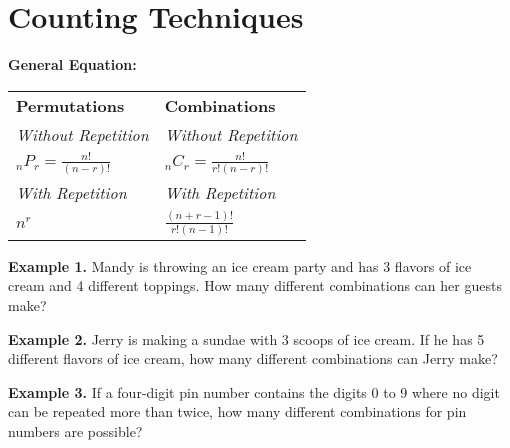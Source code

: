 \section{Counting Techniques}

\bigskip
\textbf{General Equation:} 

\begin{tabularx}{\textwidth}{*2{@{}>{\centering\arraybackslash}X}}
\textbf{Permutations} & \textbf{Combinations}\\
\textit{Without Repetition} & \textit{Without Repetition}\\
$_nP_r=\frac{n!}{(n-r)!}$ & $_nC_r=\frac{n!}{r!(n-r)!}$\\[2em]
\textit{With Repetition} & \textit{With Repetition}\\
$n^r$ & $\frac{(n+r-1)!}{r!(n-1)!}$
\end{tabularx}

\vfill
\textbf{Example 1.} Mandy is throwing an ice cream party and has 3 flavors of ice cream and 4 different toppings. How many different combinations can her guests make?

\vfill
\textbf{Example 2.} Jerry is making a sundae with 3 scoops of ice cream. If he has 5 different flavors of ice cream, how many different combinations can Jerry make?

\vfill
\textbf{Example 3.} If a four-digit pin number contains the digits 0 to 9 where no digit can be repeated more than twice, how many different combinations for pin numbers are possible?

